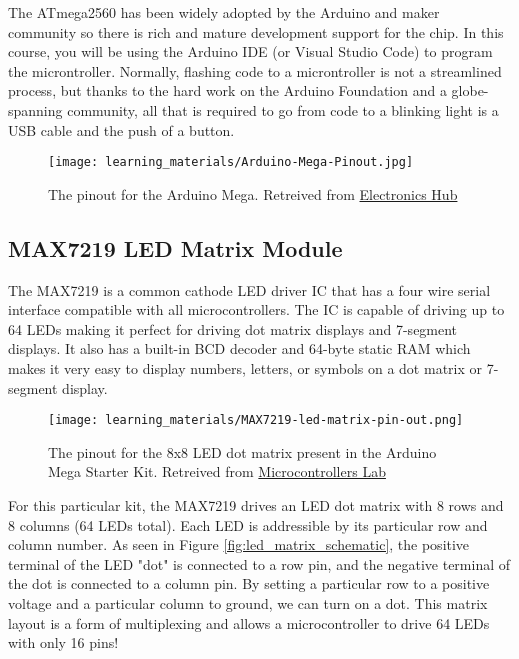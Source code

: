     The ATmega2560 has been widely adopted by the Arduino and maker community so there is rich and mature development support for the chip.
    In this course, you will be using the Arduino IDE (or Visual Studio Code) to program the microntroller. 
    Normally, flashing code to a microntroller is not a streamlined process, but thanks to the hard work on the Arduino Foundation and a globe-spanning community, all that is required to go from code to a blinking light is a USB cable and the push of a button.

    \begin{figure*}[h!]
        \texttt{[image: learning\_materials/Arduino-Mega-Pinout.jpg]}
        \caption[Arduino Mega Pinout]{The pinout for the Arduino Mega. Retreived from \href{https://www.electronicshub.org/wp-content/uploads/2021/01/Arduino-Mega-Pinout.jpg}{Electronics Hub}}
    \end{figure*}

    \pagebreak %
    \subsection*{MAX7219 LED Matrix Module}
    The MAX7219 is a common cathode LED driver IC that has a four wire serial interface compatible with all microcontrollers.
    The IC is capable of driving up to 64 LEDs making it perfect for driving dot matrix displays and 7-segment displays.
    It also has a built-in BCD decoder and 64-byte static RAM which makes it very easy to display numbers, letters, or symbols on a dot matrix or 7-segment display.

    \begin{figure}[h!]
        \texttt{[image: learning\_materials/MAX7219-led-matrix-pin-out.png]}
        \caption[LED Matrix Pinout]{The pinout for the 8x8 LED dot matrix present in the Arduino Mega Starter Kit. 
        Retreived from \href{https://microcontrollerslab.com/wp-content/uploads/2021/09/MAX7219-led-matrix-pin-out.jpg?ezimgfmt=ng:webp/ngcb1}{Microcontrollers Lab}}
    \end{figure}


    For this particular kit, the MAX7219 drives an LED dot matrix with 8 rows and 8 columns (64 LEDs total). 
    Each LED is addressible by its particular row and column number.
    As seen in Figure \ref{fig:led_matrix_schematic}, the positive terminal of the LED "dot" is connected to a row pin, and the negative terminal of the dot is connected to a column pin.
    By setting a particular row to a positive voltage and a particular column to ground, we can turn on a dot.
    This matrix layout is a form of multiplexing and allows a microcontroller to drive 64 LEDs with only 16 pins!

